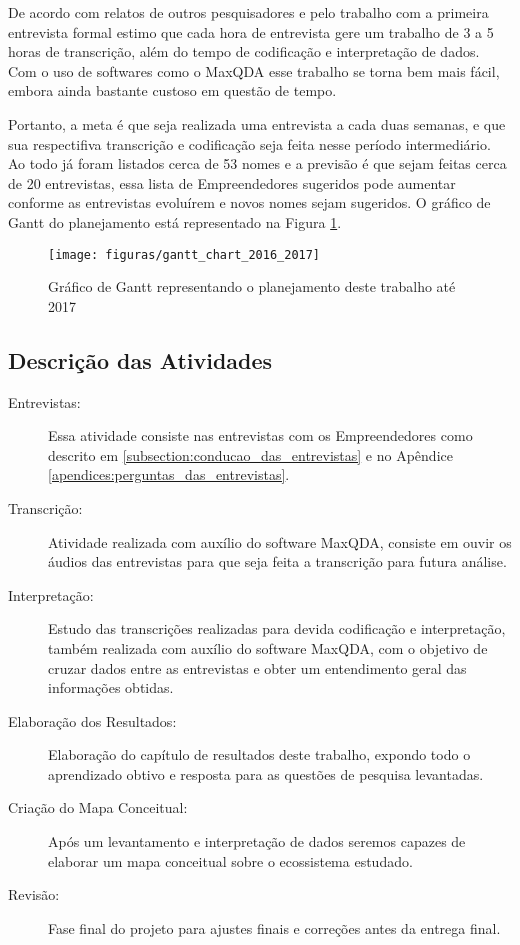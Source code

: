 De acordo com relatos de outros pesquisadores e pelo trabalho com a primeira entrevista formal estimo que cada hora de entrevista gere um trabalho de 3 a 5 horas de transcrição, além do tempo de codificação e interpretação de dados. Com o uso de softwares como o MaxQDA esse trabalho se torna bem mais fácil, embora ainda bastante custoso em questão de tempo. 

Portanto, a meta é que seja realizada uma entrevista a cada duas semanas, e que sua respectifiva transcrição e codificação seja feita nesse período intermediário. Ao todo já foram listados cerca de 53 nomes e a previsão é que sejam feitas cerca de 20 entrevistas, essa lista de Empreendedores sugeridos pode aumentar conforme as entrevistas evoluírem e novos nomes sejam sugeridos. O gráfico de Gantt do planejamento está representado na Figura \ref{figure:gantt_chart_2016_2017}.

\begin{figure}[!htb]
	\centering
	\texttt{[image: figuras/gantt\_chart\_2016\_2017]}
	\caption{Gráfico de Gantt representando o planejamento deste trabalho até 2017}
	\label{figure:gantt_chart_2016_2017}
\end{figure}

\subsection{Descrição das Atividades}
\label{subsection:descricao_das_atividades}

\begin{description}
  \item [Entrevistas:] Essa atividade consiste nas entrevistas com os Empreendedores como descrito em \ref{subsection:conducao_das_entrevistas} e no Apêndice \ref{apendices:perguntas_das_entrevistas}.

  \item [Transcrição:] Atividade realizada com auxílio do software MaxQDA, consiste em ouvir os áudios das entrevistas para que seja feita a transcrição para futura análise. 

  \item [Interpretação:] Estudo das transcrições realizadas para devida codificação e interpretação, também realizada com auxílio do software MaxQDA, com o objetivo de cruzar dados entre as entrevistas e obter um entendimento geral das informações obtidas.

  \item [Elaboração dos Resultados:] Elaboração do capítulo de resultados deste trabalho, expondo todo o aprendizado obtivo e resposta para as questões de pesquisa levantadas.

  \item [Criação do Mapa Conceitual:] Após um levantamento e interpretação de dados seremos capazes de elaborar um mapa conceitual sobre o ecossistema estudado.

  \item [Revisão:] Fase final do projeto para ajustes finais e correções antes da entrega final.
\end{description}

